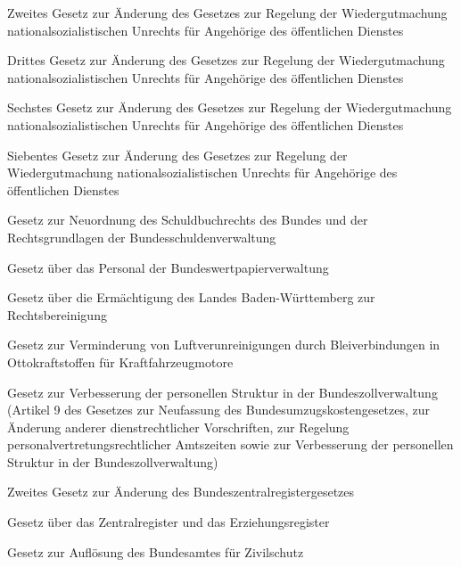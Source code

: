 \item[{BWöDGÄndG-2}] Zweites Gesetz zur Änderung des Gesetzes zur Regelung der Wiedergutmachung nationalsozialistischen Unrechts für Angehörige des öffentlichen Dienstes

\item[{BWöDGÄndG-3}] Drittes Gesetz zur Änderung des Gesetzes zur Regelung der Wiedergutmachung nationalsozialistischen Unrechts für Angehörige des öffentlichen Dienstes

\item[{BWöDGÄndG-6}] Sechstes Gesetz zur Änderung des Gesetzes zur Regelung der Wiedergutmachung nationalsozialistischen Unrechts für Angehörige des öffentlichen Dienstes

\item[{BWöDGÄndG-7}] Siebentes Gesetz zur Änderung des Gesetzes zur Regelung der Wiedergutmachung nationalsozialistischen Unrechts für Angehörige des öffentlichen Dienstes

\item[{BWpVerwG}] Gesetz zur Neuordnung des Schuldbuchrechts des Bundes und der Rechtsgrundlagen der Bundesschuldenverwaltung

\item[{BWpVerwPG}] Gesetz über das Personal der Bundeswertpapierverwaltung

\item[{BWRBerErmG}] Gesetz über die Ermächtigung des Landes Baden-Württemberg zur Rechtsbereinigung

\item[{BzBlG}] Gesetz zur Verminderung von Luftverunreinigungen durch Bleiverbindungen in Ottokraftstoffen für Kraftfahrzeugmotore

\item[{BZollVPSVerbG}] Gesetz zur Verbesserung der personellen Struktur in der Bundeszollverwaltung (Artikel 9 des Gesetzes zur Neufassung des Bundesumzugskostengesetzes, zur Änderung anderer dienstrechtlicher Vorschriften, zur Regelung personalvertretungsrechtlicher Amtszeiten sowie zur Verbesserung der personellen Struktur in der Bundeszollverwaltung)

\item[{BZRÄndG-2}] Zweites Gesetz zur Änderung des Bundeszentralregistergesetzes

\item[{BZRG}] Gesetz über das Zentralregister und das Erziehungsregister

\item[{BZSAuflG}] Gesetz zur Auflösung des Bundesamtes für Zivilschutz

